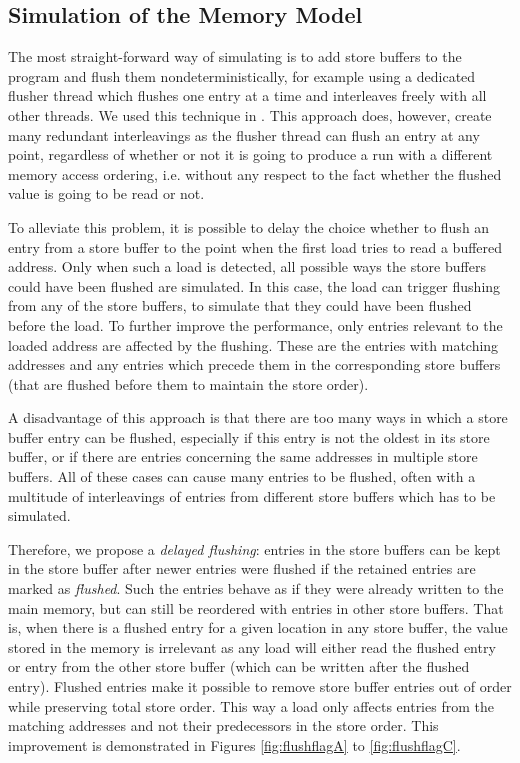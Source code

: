 \subsection{Simulation of the \xtso Memory Model}

The most straight-forward way of simulating \xtso is to add store buffers to the program and flush them nondeterministically, for example using a dedicated flusher thread which flushes one entry at a time and interleaves freely with all other threads.
We used this technique in \cite{SRB15weakmem}.
This approach does, however, create many redundant interleavings as the flusher
thread can flush an entry at any point, regardless of whether or not it is going
to produce a run with a different memory access ordering, i.e. without any
respect to the fact whether the flushed value is going to be read or not.

To alleviate this problem, it is possible to delay the choice whether to flush
an entry from a store buffer to the point when the first load tries to read a buffered address.
Only when such a load is detected, all possible ways the store buffers could have been flushed are simulated.
In this case, the load can trigger flushing from any of the store buffers, to simulate that they could have been flushed before the load.
To further improve the performance, only entries relevant to the loaded address
are affected by the flushing.
These are the entries with matching addresses and any entries which precede them in the corresponding store buffers (that are flushed before them to maintain the store order).

A disadvantage of this approach is that there are too many ways in which a store
buffer entry can be flushed, especially if this entry is not the oldest in its
store buffer, or if there are entries concerning the same addresses in multiple store buffers.
All of these cases can cause many entries to be flushed, often with a multitude of interleavings of entries from different store buffers which has to be simulated.

Therefore, we propose a \emph{delayed flushing}: entries in the store buffers can be kept in the store buffer after newer entries were flushed if the retained entries are marked as \emph{flushed}.
Such the entries behave as if they were already written to the main memory, but can still be reordered with entries in other store buffers.
That is, when there is a flushed entry for a given location in any store buffer, the value stored in the memory is irrelevant as any load will either read the flushed entry or entry from the other store buffer (which can be written after the flushed entry).
Flushed entries make it possible to remove store buffer entries out of order while preserving total store order.
This way a load only affects entries from the matching addresses and not their predecessors in the store order.
This improvement is demonstrated in Figures \ref{fig:flushflagA} to \ref{fig:flushflagC}.



